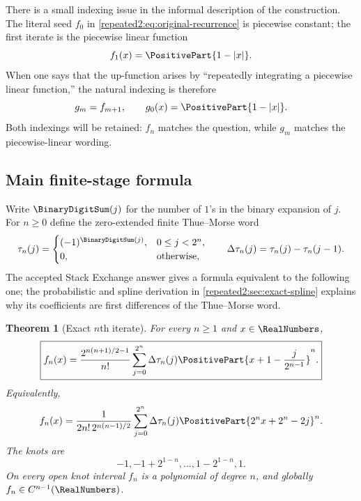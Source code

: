 \documentclass[11pt,oneside]{article}
\newtheorem{theorem}{Theorem}[section]
\theoremstyle{definition}
\theoremstyle{remark}
\begin{document}
There is a small indexing issue in the informal description of the construction.  The
literal seed $f_0$ in \eqref{repeated2:eq:original-recurrence} is piecewise constant; the first iterate
is the piecewise linear function
\begin{equation}
 f_1(x)=\PositivePart{1-|x|}.
 \label{repeated2:eq:tent}
\end{equation}
When one says that the up-function arises by ``repeatedly integrating a piecewise linear
function,'' the natural indexing is therefore
\begin{equation}
 g_m=f_{m+1},\qquad g_0(x)=\PositivePart{1-|x|}.
 \label{repeated2:eq:linear-indexing}
\end{equation}
Both indexings will be retained: $f_n$ matches the question, while $g_m$ matches the
piecewise-linear wording.

\subsection{Main finite-stage formula}

Write $\BinaryDigitSum(j)$ for the number of $1$'s in the binary expansion of $j$.  For $n\ge0$ define
the zero-extended finite Thue--Morse word
\begin{equation}
 \tau_n(j)=
 \begin{cases}
  (-1)^{\BinaryDigitSum(j)},&0\le j<2^n,\\
  0,&\text{otherwise},
 \end{cases}
 \qquad
 \Delta\tau_n(j)=\tau_n(j)-\tau_n(j-1).
 \label{repeated2:eq:tau-definition}
\end{equation}
The accepted Stack Exchange answer gives a formula equivalent to the following one; the
probabilistic and spline derivation in \cref{repeated2:sec:exact-spline} explains why its coefficients
are first differences of the Thue--Morse word.

\begin{theorem}[Exact $n$th iterate]
\label{repeated2:thm:exact-iterate-intro}
For every $n\ge1$ and $x\in\RealNumbers$,
\begin{equation}
 \boxed{\displaystyle
 f_n(x)=\frac{2^{n(n+1)/2-1}}{n!}
 \sum_{j=0}^{2^n}\Delta\tau_n(j)
 \PositivePart{x+1-\frac{j}{2^{n-1}}}^{n}.}
 \label{repeated2:eq:exact-iterate-intro}
\end{equation}
Equivalently,
\begin{equation}
 f_n(x)=\frac{1}{2n!\,2^{n(n-1)/2}}
 \sum_{j=0}^{2^n}\Delta\tau_n(j)
 \PositivePart{2^nx+2^n-2j}^{n}.
 \label{repeated2:eq:exact-iterate-mse-scaling}
\end{equation}
The knots are
\begin{equation}
 -1,-1+2^{1-n},\ldots,1-2^{1-n},1.
 \label{repeated2:eq:iterate-knots}
\end{equation}
On every open knot interval $f_n$ is a polynomial of degree $n$, and globally
$f_n\in C^{n-1}(\RealNumbers)$.
\end{theorem}
\end{document}
